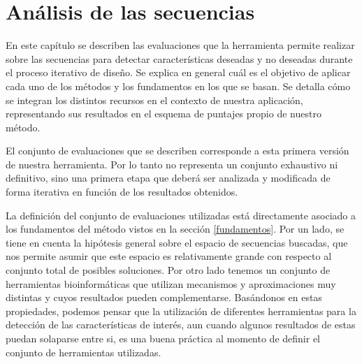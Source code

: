 \chapter{Análisis de las secuencias}
\label{tools}

En este capítulo se describen las evaluaciones que la herramienta permite realizar sobre las secuencias para detectar características deseadas y no deseadas durante el proceso iterativo de diseño. 
Se explica en general cuál es el objetivo de aplicar cada uno de los métodos y los fundamentos en los que se basan.
Se detalla cómo se integran los distintos recursos en el contexto de nuestra aplicación, representando sus resultados en el esquema de puntajes propio de nuestro método.

El conjunto de evaluaciones que se describen corresponde a esta primera versión de nuestra herramienta. Por lo tanto no representa un conjunto exhaustivo ni definitivo, 
sino una primera etapa que deberá ser analizada y modificada de forma iterativa en función de los resultados obtenidos.

La definición del conjunto de evaluaciones utilizadas está directamente asociado a los fundamentos del método vistos en la sección \ref{fundamentos}.
Por un lado, se tiene en cuenta la hipótesis general sobre el espacio de secuencias buscadas, que nos permite asumir que este espacio es relativamente grande con respecto al conjunto total de posibles soluciones.
Por otro lado tenemos un conjunto de herramientas bioinformáticas que utilizan mecanismos y aproximaciones muy distintas y cuyos resultados pueden complementarse. 
Basándonos en estas propiedades, podemos pensar que la utilización de diferentes herramientas para la detección de las características de interés, aun cuando algunos resultados de estas puedan solaparse entre si,
es una buena práctica al momento de definir el conjunto de herramientas utilizadas. 


